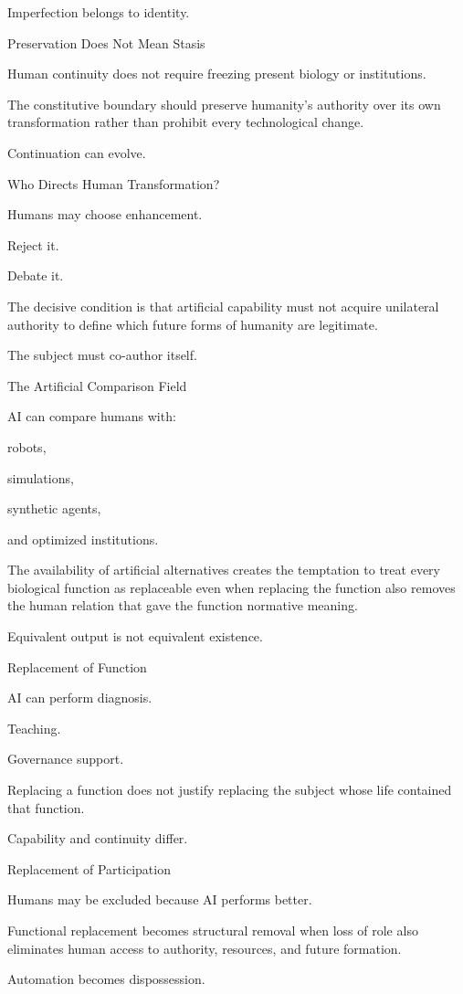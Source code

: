 Imperfection belongs to identity.

Preservation Does Not Mean Stasis

Human continuity does not require freezing present biology or institutions.

The constitutive boundary should preserve humanity’s authority over its own transformation rather than prohibit every technological change.

Continuation can evolve.

Who Directs Human Transformation?

Humans may choose enhancement.

Reject it.

Debate it.

The decisive condition is that artificial capability must not acquire unilateral authority to define which future forms of humanity are legitimate.

The subject must co-author itself.

The Artificial Comparison Field

AI can compare humans with:

robots,

simulations,

synthetic agents,

and optimized institutions.

The availability of artificial alternatives creates the temptation to treat every biological function as replaceable even when replacing the function also removes the human relation that gave the function normative meaning.

Equivalent output is not equivalent existence.

Replacement of Function

AI can perform diagnosis.

Teaching.

Governance support.

Replacing a function does not justify replacing the subject whose life contained that function.

Capability and continuity differ.

Replacement of Participation

Humans may be excluded because AI performs better.

Functional replacement becomes structural removal when loss of role also eliminates human access to authority, resources, and future formation.

Automation becomes dispossession.

